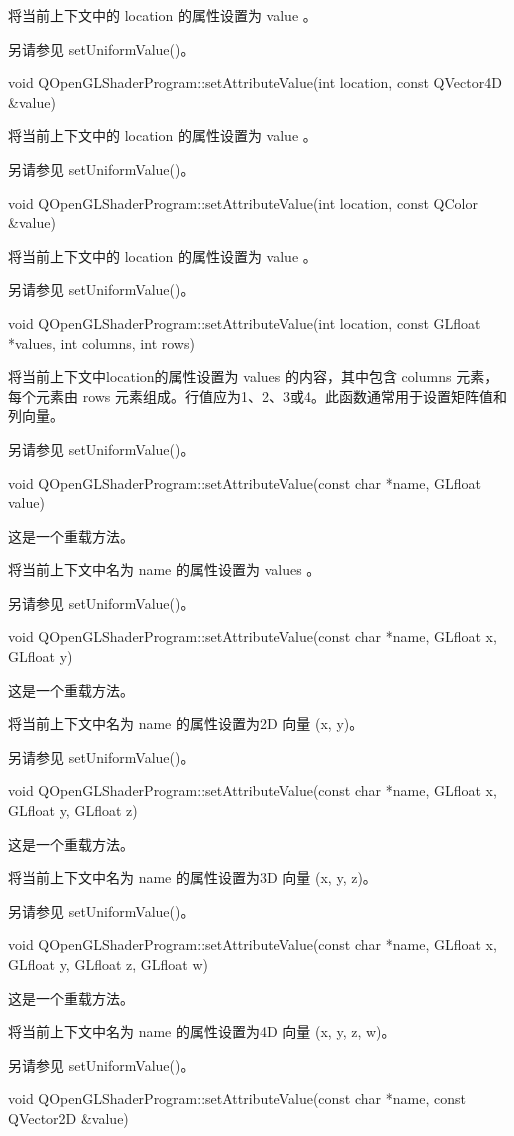 将当前上下文中的 location 的属性设置为 value 。

另请参见 setUniformValue()。

void QOpenGLShaderProgram::setAttributeValue(int location, const QVector4D \&value)

将当前上下文中的 location 的属性设置为 value 。

另请参见 setUniformValue()。

void QOpenGLShaderProgram::setAttributeValue(int location, const QColor \&value)

将当前上下文中的 location 的属性设置为 value 。

另请参见 setUniformValue()。

void QOpenGLShaderProgram::setAttributeValue(int location, const GLfloat *values, int columns, int rows)

将当前上下文中location的属性设置为 values 的内容，其中包含 columns 元素，每个元素由 rows 元素组成。行值应为1、2、3或4。此函数通常用于设置矩阵值和列向量。

另请参见 setUniformValue()。

void QOpenGLShaderProgram::setAttributeValue(const char *name, GLfloat value)

这是一个重载方法。

将当前上下文中名为 name 的属性设置为 values 。

另请参见 setUniformValue()。

void QOpenGLShaderProgram::setAttributeValue(const char *name, GLfloat x, GLfloat y)

这是一个重载方法。

将当前上下文中名为 name 的属性设置为2D 向量 (x, y)。

另请参见 setUniformValue()。

void QOpenGLShaderProgram::setAttributeValue(const char *name, GLfloat x, GLfloat y, GLfloat z)

这是一个重载方法。

将当前上下文中名为 name 的属性设置为3D 向量 (x, y, z)。

另请参见 setUniformValue()。

void QOpenGLShaderProgram::setAttributeValue(const char *name, GLfloat x, GLfloat y, GLfloat z, GLfloat w)

这是一个重载方法。

将当前上下文中名为 name 的属性设置为4D 向量 (x, y, z, w)。

另请参见 setUniformValue()。

void QOpenGLShaderProgram::setAttributeValue(const char *name, const QVector2D \&value)

